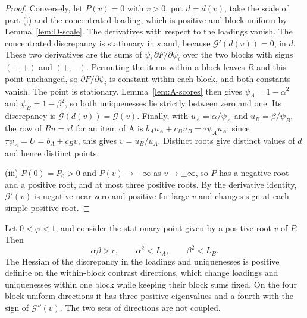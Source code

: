 \begin{proof}
Conversely, let $P(v)=0$ with $v>0$, put $d=d(v)$, take the scale of part (i) and the concentrated loading, which is positive and block uniform by Lemma~\ref{lem:D-scale}. The derivatives with respect to the loadings vanish. The concentrated discrepancy is stationary in $s$ and, because $\mathcal G'(d(v))=0$, in $d$. These two derivatives are the sums of $\psi_i\,\partial F/\partial\psi_i$ over the two blocks with signs $(+,+)$ and $(+,-)$. Permuting the items within a block leaves $R$ and this point unchanged, so $\partial F/\partial\psi_i$ is constant within each block, and both constants vanish. The point is stationary. Lemma~\ref{lem:A-scores} then gives $\psi_A=1-\alpha^2$ and $\psi_B=1-\beta^2$, so both uniquenesses lie strictly between zero and one. Its discrepancy is $\mathcal G(d(v))=\mathcal G(v)$. Finally, with $u_A=\alpha/\psi_A$ and $u_B=\beta/\psi_B$, the row of $Ru=\tau l$ for an item of A is $b_Au_A+c_Bu_B=\tau\psi_Au_A$; since $\tau\psi_A=U=b_A+c_Bv$, this gives $v=u_B/u_A$. Distinct roots give distinct values of $d$ and hence distinct points.

(iii) $P(0)=P_0>0$ and $P(v)\to-\infty$ as $v\to\pm\infty$, so $P$ has a negative root and a positive root, and at most three positive roots. By the derivative identity, $\mathcal G'(v)$ is negative near zero and positive for large $v$ and changes sign at each simple positive root.
\end{proof}

\begin{applemma}
\label{lem:D-hessian}
Let $0<\varphi<1$, and consider the stationary point given by a positive root $v$ of $P$. Then
\[
\alpha\beta>c,\qquad \alpha^2<L_A,\qquad \beta^2<L_B .
\]
The Hessian of the discrepancy in the loadings and uniquenesses is positive definite on the within-block contrast directions, which change loadings and uniquenesses within one block while keeping their block sums fixed. On the four block-uniform directions it has three positive eigenvalues and a fourth with the sign of $\mathcal G''(v)$. The two sets of directions are not coupled.
\end{applemma}


